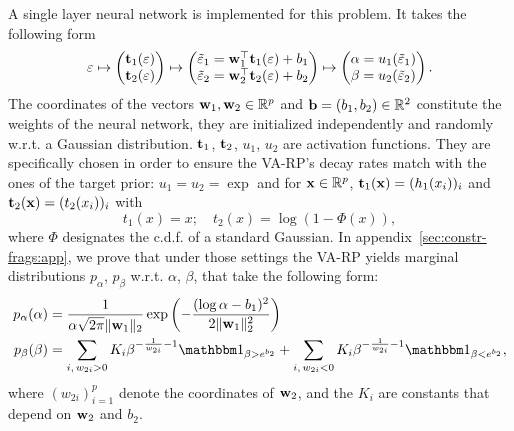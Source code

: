 A single layer neural network is implemented for this problem. It takes the following form
\begin{equation}\label{eq:neuralnet-architecture}
    \varepsilon \mapsto \begin{pmatrix}
        \mathbf{t}_1(\varepsilon)\\ \mathbf{t}_2(\varepsilon) 
    \end{pmatrix} \mapsto
    \begin{pmatrix}
        \tilde{\varepsilon}_1 = \mathbf{w}_1^\top\mathbf{t}_1(\varepsilon) + b_1 \\
        \tilde{\varepsilon}_2 = \mathbf{w}_2^\top\mathbf{t}_2(\varepsilon)+b_2 
    \end{pmatrix} \mapsto
    \begin{pmatrix}
        \alpha = u_1(\tilde{\varepsilon}_1)\\
        \beta = u_2(\tilde{\varepsilon}_2)
    \end{pmatrix}.
\end{equation}
The coordinates of the vectors $\mathbf{w}_1,\mathbf{w}_2\in\mathbb{R}^p$ and $\mathbf{b}=(b_1,b_2)\in\mathbb{R}^2$ constitute the weights of the neural network, they are initialized independently and randomly w.r.t. a Gaussian distribution. $\mathbf{t}_1$, $\mathbf{t}_2$, $u_1$, $u_2$ are activation functions.
They are specifically chosen in order to ensure the VA-RP's decay rates match with the ones of the target prior: $u_1=u_2=\exp$ and for $\mathbf{x}\in\mathbb{R}^p$, $\mathbf{t}_1(\mathbf{x})=(h_1(x_i))_i$ and $\mathbf{t}_2(\mathbf{x})=(t_2(x_i))_i$ with
\begin{equation}
    t_1(x) = x;\quad t_2(x) = \log(1-\Phi(x)),
\end{equation}
where $\Phi$ designates the c.d.f. of a standard Gaussian.
In appendix~\ref{sec:constr-frags:app}, we prove that under those settings the VA-RP yields marginal distributions $ p_\alpha$, $p_\beta$ w.r.t. $\alpha$, $\beta$, that take the following form:
    \begin{equation}
        \begin{aligned}
        p_\alpha(\alpha) &= \frac{1}{\alpha\sqrt{2\pi}\|\mbf w_1 \|_2}\exp\left(-\frac{(\log\alpha - b_1)^2}{2\|\mbf w_1\|^2_2}\right) \\
        p_\beta(\beta) &= \sum_{i,\, w_{2i}>0}{K_i}\beta^{-\frac{1}{w_{2i}}-1}\indic_{\beta>e^{b_2}} + \sum_{i,\, w_{2i}<0}K_i\beta^{-\frac{1}{w_{2i}}-1}\indic_{\beta<e^{b_2}},
    \end{aligned}
    \label{eq:marginaldist}
    \end{equation}
where $(w_{2i})_{i=1}^p$ denote the coordinates of $\mathbf{w}_2$, and the $K_i$ are constants that depend on $\mathbf{w}_2$ and $b_2$. 
